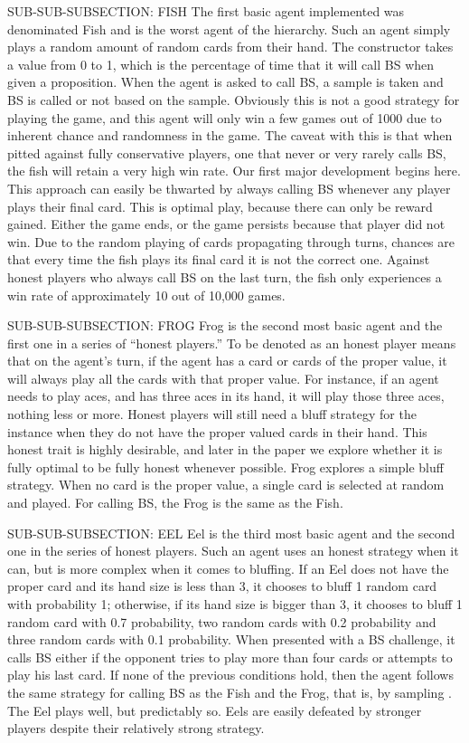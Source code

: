 \documentclass[a4paper,12pt]{article}
\begin{document}
	SUB-SUB-SUBSECTION: FISH
	The first basic agent implemented was denominated Fish and is the worst agent of the hierarchy. Such an agent simply plays a random amount of random cards from their hand. The constructor takes a value from 0 to 1, which is the percentage of time that it will call BS when given a proposition. When the agent is asked to call BS, a sample is taken and BS is called or not based on the sample. Obviously this is not a good strategy for playing the game, and this agent will only win a few games out of 1000 due to inherent chance and randomness in the game. The caveat with this is that when pitted against fully conservative players, one that never or very rarely calls BS, the fish will retain a very high win rate. Our first major development begins here. This approach can easily be thwarted by always calling BS whenever any player plays their final card. This is optimal play, because there can only be reward gained. Either the game ends, or the game persists because that player did not win. Due to the random playing of cards propagating through turns, chances are that every time the fish plays its final card it is not the correct one. Against honest players who always call BS on the last turn, the fish only experiences a win rate of approximately 10 out of 10,000 games. 

	SUB-SUB-SUBSECTION: FROG
	Frog is the second most basic agent and the first one in a series of “honest players.” To be denoted as an honest player means that on the agent’s turn, if the agent has a card or cards of the proper value, it will always play all the cards with that proper value. For instance, if an agent needs to play aces, and has three aces in its hand, it will play those three aces, nothing less or more. Honest players will still need a bluff strategy for the instance when they do not have the proper valued cards in their hand. This honest trait is highly desirable, and later in the paper we explore whether it is fully optimal to be fully honest whenever possible. Frog explores a simple bluff strategy. When no card is the proper value, a single card is selected at random and played. For calling BS, the Frog is the same as the Fish. 

	SUB-SUB-SUBSECTION: EEL
Eel is the third most basic agent and the second one in the series of honest players. Such an agent uses an honest strategy when it can, but is more complex when it comes to bluffing. If an Eel does not have the proper card and its hand size is less than 3, it chooses to bluff 1 random card with probability 1; otherwise, if its hand size is bigger than 3, it chooses to bluff 1 random card with 0.7 probability, two random cards with 0.2 probability and three random cards with 0.1 probability. When presented with a BS challenge, it calls BS either if the opponent tries to play more than four cards or attempts to play his last card. If none of the previous conditions hold, then the agent follows the same strategy for calling BS as the Fish and the Frog, that is, by sampling . The Eel plays well, but predictably so. Eels are easily defeated by stronger players despite their relatively strong strategy.
\end{document}
